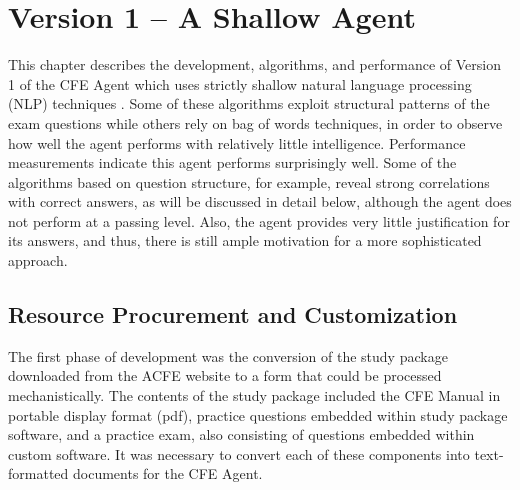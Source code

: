 
%

\chapter{Version 1 -- A Shallow Agent}


This chapter describes the development, algorithms, and performance of Version 1 of the CFE Agent which uses strictly shallow natural language processing (NLP) techniques \cite{martin_2000_speech_ch23}.  Some of these algorithms exploit structural patterns of the exam questions while others rely on bag of words techniques, in order to observe how well the agent performs with relatively little intelligence.  Performance measurements indicate this agent performs surprisingly well.  Some of the algorithms based on question structure, for example, reveal strong correlations with correct answers, as will be discussed in detail below, although the agent does not perform at a passing level.  Also, the agent provides very little justification for its answers, and thus, there is still ample motivation for a more sophisticated approach.

\section{Resource Procurement and Customization}

The first phase of development was the conversion of the study package downloaded from the ACFE website to a form that could be processed mechanistically.  The contents of the study package included the CFE Manual in portable display format (pdf), practice questions embedded within study package software, and a practice exam, also consisting of questions embedded within custom software.  It was necessary to convert each of these components into text-formatted documents for the CFE Agent.

